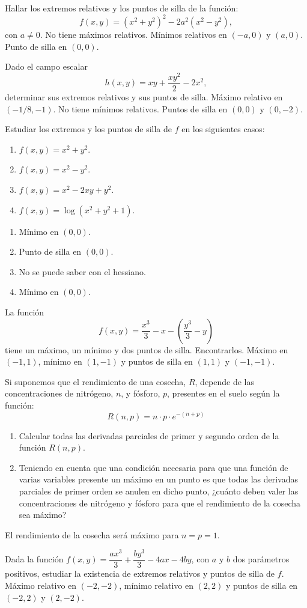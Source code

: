 
{Hallar los extremos relativos y los puntos de silla de la función:
\[
f(x,y) = (x^2+y^2)^2-2a^2(x^2-y^2),
\]
con $a\neq 0$.
}
{No tiene máximos relativos. Mínimos relativos en $(-a,0)$ y $(a,0)$. Punto de silla en $(0,0)$.
}
{
}


{Dado el campo escalar
\[
h(x,y) = xy+\frac{xy^2}{2}-2x^2,
\]
determinar sus extremos relativos y sus puntos de silla.
}
{Máximo relativo en $(-1/8,-1)$. No tiene mínimos relativos. Puntos de silla en $(0,0)$ y $(0,-2)$.
}
{
}

{Estudiar los extremos y los puntos de silla de $f$ en los siguientes casos:
\begin{enumerate}
\item $f(x,y) = x^2+y^2$.
\item $f(x,y) = x^2-y^2$.
\item $f(x,y) = x^2-2xy+y^2$.
\item $f(x,y) = \log(x^2+y^2+1)$.
\end{enumerate}
}
{\begin{enumerate}
\item Mínimo en $(0,0)$.
\item Punto de silla en $(0,0)$.
\item No se puede saber con el hessiano.
\item Mínimo en $(0,0)$.
\end{enumerate}
}
{
}


{La función
\[
f(x,y) = \frac{x^3}{3}-x-\left(\frac{y^3}{3}-y\right)
\]
tiene un máximo, un mínimo y dos puntos de silla. Encontrarlos.
}
{Máximo en $(-1,1)$, mínimo en $(1,-1)$ y puntos de silla en $(1,1)$ y $(-1,-1)$.
}
{
}


{Si suponemos que el rendimiento de una cosecha, $R$, depende de las concentraciones de nitrógeno, $n$, y fósforo, $p$, presentes en el suelo según la función:
\[
R(n,p) = n \cdot p \cdot e^{ - (n + p)}
\]
\begin{enumerate}
\item Calcular todas las derivadas parciales de primer y segundo orden de la función $R(n,p)$.
\item Teniendo en cuenta que una condición necesaria para que una función de varias variables presente un máximo en un
punto es que todas las derivadas parciales de primer orden se anulen en dicho punto, ¿cuánto deben valer las
concentraciones de nitrógeno y fósforo para que el rendimiento de la cosecha sea máximo?
\end{enumerate}
}
{El rendimiento de la cosecha será máximo para $n=p=1$.
}
{
}


{Dada la función $f(x,y)=\dfrac{ax^3}{3} + \dfrac{by^3}{3}-4ax-4by$, con $a$ y $b$ dos parámetros positivos, estudiar la existencia de extremos relativos y puntos de silla de $f$.
}
{Máximo relativo en $(-2,-2)$, mínimo relativo en $(2,2)$ y puntos de silla en $(-2,2)$ y $(2,-2)$.
}
{
}
